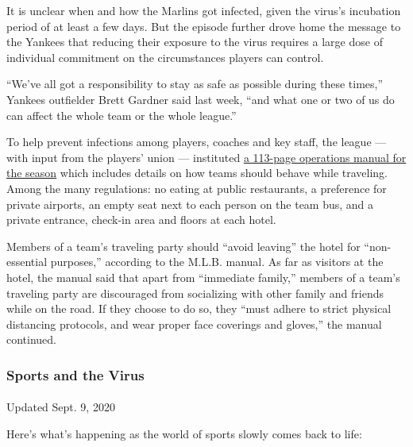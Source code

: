 It is unclear when and how the Marlins got infected, given the virus's
incubation period of at least a few days. But the episode further drove
home the message to the Yankees that reducing their exposure to the
virus requires a large dose of individual commitment on the
circumstances players can control.

``We've all got a responsibility to stay as safe as possible during
these times,'' Yankees outfielder Brett Gardner said last week, ``and
what one or two of us do can affect the whole team or the whole
league.''

To help prevent infections among players, coaches and key staff, the
league --- with input from the players' union --- instituted
\href{https://www.nytimes3xbfgragh.onion/2020/06/24/sports/baseball/mlb-coronavirus-rules.html}{a
113-page operations manual for the season} which includes details on how
teams should behave while traveling. Among the many regulations: no
eating at public restaurants, a preference for private airports, an
empty seat next to each person on the team bus, and a private entrance,
check-in area and floors at each hotel.

Members of a team's traveling party should ``avoid leaving'' the hotel
for ``non-essential purposes,'' according to the M.L.B. manual. As far
as visitors at the hotel, the manual said that apart from ``immediate
family,'' members of a team's traveling party are discouraged from
socializing with other family and friends while on the road. If they
choose to do so, they ``must adhere to strict physical distancing
protocols, and wear proper face coverings and gloves,'' the manual
continued.

\hypertarget{sports-and-the-virus}{%
\subsubsection{Sports and the Virus}\label{sports-and-the-virus}}

\paragraph{}

Updated Sept. 9, 2020

Here's what's happening as the world of sports slowly comes back to
life:

